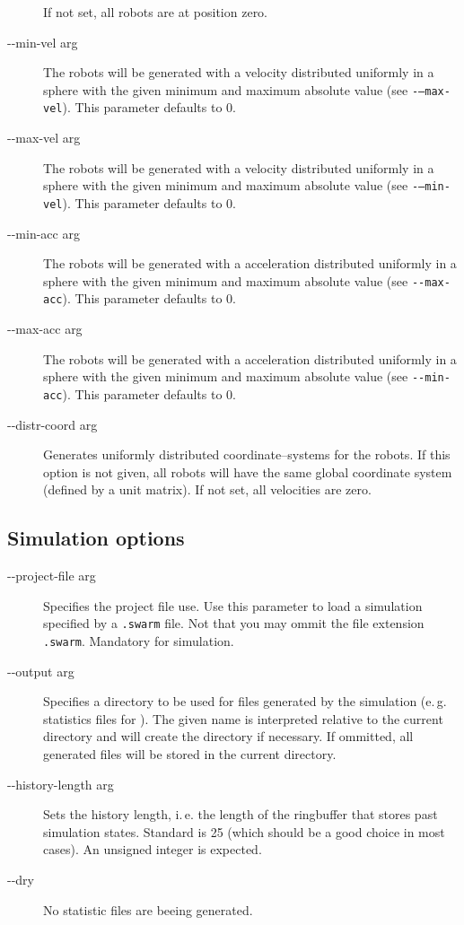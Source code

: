 \begin{description}
 If not set, all robots are at position zero.
	\item [-{}-min-vel arg] The robots will be generated with a velocity distributed uniformly in a sphere with the given minimum and maximum absolute value (see {\tt -{}---max-vel}). This parameter defaults to 0.
	\item [-{}-max-vel arg] The robots will be generated with a velocity distributed uniformly in a sphere with the given minimum and maximum absolute value (see {\tt -{}---min-vel}). This parameter defaults to 0.
	\item [-{}-min-acc arg] The robots will be generated with a acceleration distributed uniformly in a sphere with the given minimum and maximum absolute value (see {\tt -{}-max-acc}). This parameter defaults to 0.
	\item [-{}-max-acc arg] The robots will be generated with a acceleration distributed uniformly in a sphere with the given minimum and maximum absolute value (see {\tt -{}-min-acc}). This parameter defaults to 0.
	\item [-{}-distr-coord arg] Generates uniformly distributed coordinate--systems for the robots. If this option is not given, all robots will have the same global coordinate system (defined by a unit matrix).
 If not set, all velocities are zero.
\end{description}

\subsection{Simulation options}
\begin{description}
	\item [-{}-project-file arg] Specifies the project file use. Use this parameter to load a simulation specified by a {\tt .swarm} file. Not that you may ommit the file extension {\tt .swarm}. Mandatory for simulation.
	\item [-{}-output arg] Specifies a directory to be used for files generated by the simulation (e.\,g. statistics files for \gnuplot). The given name is interpreted relative to the current directory and will create the directory if necessary. If ommitted, all generated files will be stored in the current directory.
	\item [-{}-history-length arg] Sets the history length, i.\,e. the length of the ringbuffer that stores past simulation states. Standard is 25 (which should be a good choice in most cases). An unsigned integer is expected.
	\item [-{}-dry] No statistic files are beeing generated.
\end{description}


